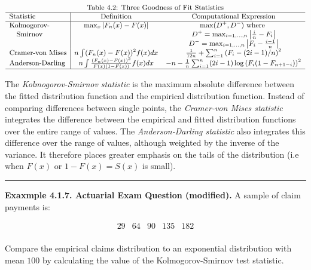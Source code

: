 \documentclass[]{book}
\theoremstyle{definition}
\theoremstyle{definition}
\theoremstyle{definition}
\theoremstyle{remark}
\begin{document}
\[
{\small
\begin{matrix}
\text{Table 4.2: Three Goodness of Fit Statistics} \\
\begin{array}{l|cc}
\hline
\text{Statistic} & \text{Definition} & \text{Computational Expression} \\
\hline
\text{Kolmogorov-} & \max_x |F_n(x) - F(x)| & \max(D^+, D^-) \text{ where } \\
~~~\text{Smirnov} && D^+ = \max_{i=1, \ldots, n} \left|\frac{i}{n} - F_i\right| \\
&& D^- = \max_{i=1, \ldots, n} \left| F_i - \frac{i-1}{n} \right| \\
\text{Cramer-von Mises} & n \int (F_n(x) - F(x))^2 f(x) dx & \frac{1}{12n} + \sum_{i=1}^n \left(F_i - (2i-1)/n\right)^2 \\
\text{Anderson-Darling} & n \int \frac{(F_n(x) - F(x))^2}{F(x)(1-F(x))} f(x) dx & -n-\frac{1}{n} \sum_{i=1}^n (2i-1) \log\left(F_i(1-F_{n+1-i})\right)^2 \\
\hline
\end{array} \\
\end{matrix}
}
\]

The \emph{Kolmogorov-Smirnov statistic} is the maximum absolute
difference between the fitted distribution function and the empirical
distribution function. Instead of comparing differences between single
points, the \emph{Cramer-von Mises statistic} integrates the difference
between the empirical and fitted distribution functions over the entire
range of values. The \emph{Anderson-Darling statistic} also integrates
this difference over the range of values, although weighted by the
inverse of the variance. It therefore places greater emphasis on the
tails of the distribution (i.e when \(F(x)\) or \(1-F(x)=S(x)\) is
small).

\begin{center}\rule{0.5\linewidth}{\linethickness}\end{center}

\textbf{Exaxmple 4.1.7. Actuarial Exam Question (modified).} A sample of
claim payments is:

\[
\begin{array}{ccccc}
29 & 64 & 90 & 135 & 182  \\
\end{array}
\]

Compare the empirical claims distribution to an exponential distribution
with mean \(100\) by calculating the value of the Kolmogorov-Smirnov
test statistic.
\end{document}
